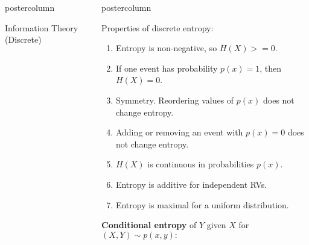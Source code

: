 \documentclass{beamer}
\newlength{\columnheight} %
\begin{document}
\begin{frame}[fragile]{}
\begin{columns}
\begin{column}{.31\textwidth}
\begin{beamercolorbox}[center]{postercolumn}
\begin{minipage}{.98\textwidth}
{\begin{myblock}{Information Theory (Discrete)}
							\end{myblock}
						}
					\end{minipage}
				\end{beamercolorbox}
			\end{column}

			\begin{column}{.31\textwidth}
				\begin{beamercolorbox}[center]{postercolumn}
					\begin{minipage}{.98\textwidth}
						\parbox[t][\columnheight]{\textwidth}{


							\begin{myblock}{} \vspace{-4ex}
								Properties of discrete entropy:
								\begin{enumerate}
									\setlength{\itemindent}{+.3in}
									\item Entropy is non-negative, so $H(X) >= 0$.
									\item If one event has probability $p(x) = 1$, then $H(X)=0$. 
									\item Symmetry. Reordering values of $p(x)$ does not change entropy.
									\item Adding or removing an event with $p(x)=0$ does not change entropy.
									\item $H(X)$ is continuous in probabilities $p(x)$.
									\item Entropy is additive for independent RVs.
									\item Entropy is maximal for a uniform distribution.
								\end{enumerate}
								\vspace*{1ex}
								\textbf{Conditional entropy} of $Y$  given $X$ for $(X, Y) \sim p(x, y):$
								\vspace{-0.2cm}
								\begin{small}  
									\begin{equation*}
										\begin{aligned}

\end{aligned}
\end{equation*}
\end{small}
\end{myblock}}
\end{minipage}
\end{beamercolorbox}
\end{column}
\end{columns}
\end{frame}
\end{document}
